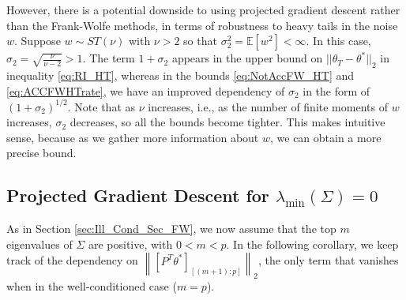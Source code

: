 \documentclass{article}
\begin{document}
However, there is a potential downside to using projected gradient descent rather than the Frank-Wolfe methods, in terms of robustness to heavy tails in the noise $w$. Suppose $w \sim ST(\nu)$ with $\nu > 2$ so that $\sigma_2^2 = \mathbb{E}[w^2] < \infty$. In this case, $\sigma_2 = \sqrt{\frac{\nu}{\nu - 2}} > 1$. The term $1 + \sigma_2$ appears in the upper bound on $||\theta_T - \theta^*||_2$ in inequality \eqref{eq:RI_HT}, whereas in the bounds \eqref{eq:NotAccFW_HT} and \eqref{eq:ACCFWHTrate}, we have an improved dependency of $\sigma_2$ in the form of $(1 + \sigma_2)^{1/2}$. Note that as $\nu$ increases, i.e., as the number of finite moments of $w$ increases, $\sigma_2$ decreases, so all the bounds become tighter. This makes intuitive sense, because as we gather more information about $w$, we can obtain a more precise bound.


\subsection{Projected Gradient Descent for $\lambda_{\min}(\Sigma) = 0$}
\label{sec:Projected Gradient Descent for l=0}

As in Section \ref{sec:Ill_Cond_Sec_FW}, we now assume that the top $m$ eigenvalues of $\Sigma$ are positive, with $0 < m < p$. In the following corollary, we keep track of the dependency on $\left\|[P^T\theta^*]_{[(m+1):p]}\right\|_2$, the only term that vanishes when in the well-conditioned case ($m = p$). 
\end{document}
